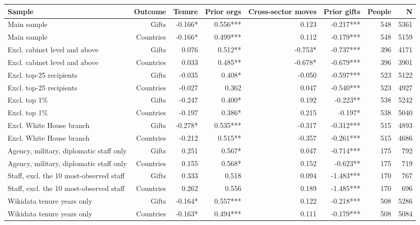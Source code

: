 \begin{tabular}{lrrrrrrr}
\toprule
Sample & Outcome & Tenure & Prior orgs & Cross-sector moves & Prior gifts & People & N \\
\midrule
Main sample & Gifts & -0.166* & 0.556*** & 0.123 & -0.217*** & 548 & 5361 \\
Main sample & Countries & -0.166* & 0.499*** & 0.112 & -0.179*** & 548 & 5159 \\
Excl. cabinet level and above & Gifts & 0.076 & 0.512** & -0.753* & -0.737*** & 396 & 4171 \\
Excl. cabinet level and above & Countries & 0.033 & 0.485** & -0.678* & -0.679*** & 396 & 3901 \\
Excl. top-25 recipients & Gifts & -0.035 & 0.408* & -0.050 & -0.597*** & 523 & 5122 \\
Excl. top-25 recipients & Countries & -0.027 & 0.362 & 0.047 & -0.540*** & 523 & 4927 \\
Excl. top 1\% & Gifts & -0.247 & 0.400* & 0.192 & -0.223** & 538 & 5242 \\
Excl. top 1\% & Countries & -0.197 & 0.386* & 0.215 & -0.197* & 538 & 5040 \\
Excl. White House branch & Gifts & -0.278* & 0.535*** & -0.317 & -0.312*** & 515 & 4893 \\
Excl. White House branch & Countries & -0.212 & 0.515** & -0.357 & -0.261*** & 515 & 4686 \\
Agency, military, diplomatic staff only & Gifts & 0.251 & 0.567* & 0.047 & -0.714*** & 175 & 792 \\
Agency, military, diplomatic staff only & Countries & 0.155 & 0.568* & 0.152 & -0.623** & 175 & 719 \\
Staff, excl. the 10 most-observed staff & Gifts & 0.333 & 0.518 & 0.094 & -1.483*** & 170 & 767 \\
Staff, excl. the 10 most-observed staff & Countries & 0.262 & 0.556 & 0.189 & -1.485*** & 170 & 696 \\
Wikidata tenure years only & Gifts & -0.164* & 0.557*** & 0.122 & -0.218*** & 508 & 5286 \\
Wikidata tenure years only & Countries & -0.163* & 0.494*** & 0.111 & -0.179*** & 508 & 5084 \\
\bottomrule
\end{tabular}
\par{}
